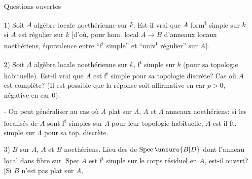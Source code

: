 
Questions ouvertes

1) Soit $A$ algèbre locale noethérienne sur $k$. Est-il vrai que $A$ form\textsuperscript{t} simple sur $k$ si $A$ est  régulier sur $k$  [d'où, pour hom. local $A\longrightarrow B$ d'anneaux locaux noethériens, équivalence entre ``f\textsuperscript{t} simple'' et ``univ\textsuperscript{t} régulier''  sur $A$].

2) Soit $A$ algèbre locale noethérienne sur $k$, f\textsuperscript{t} simple sur $k$ (pour sa topologie habituelle). Est-il vrai que $A$ est f\textsuperscript{t} simple pour sa topologie discrète? Cas où $A$ est complète? (Il est possible que la réponse soit affirmative en car $p>0$, négative en car $0$).

 

- On peut généraliser au cas où  $A$ plat sur $\Lambda$, $A$ et $\Lambda$ anneaux noethériens: si les localisés de $A$ sont f\textsuperscript{t} simples sur  $\Lambda$ pour leur topologie habituelle, $A$ est-il ft. simple sur $\Lambda$ pour sa top. discrète.


3) $B$   sur $A$, $A$ et $B$ noethériens. Lieu des  de $\operatorname{Spec}\unsure{B|D}$ dont l'anneau local dans  fibre sur $\operatorname{Spec} A$ est f\textsuperscript{t} simple sur le corps résiduel en $A$, est-il ouvert? \deleted{[N.B: \unsure{même au|Lieu en}} [Si $B$ n'est pas plat sur $A$,
